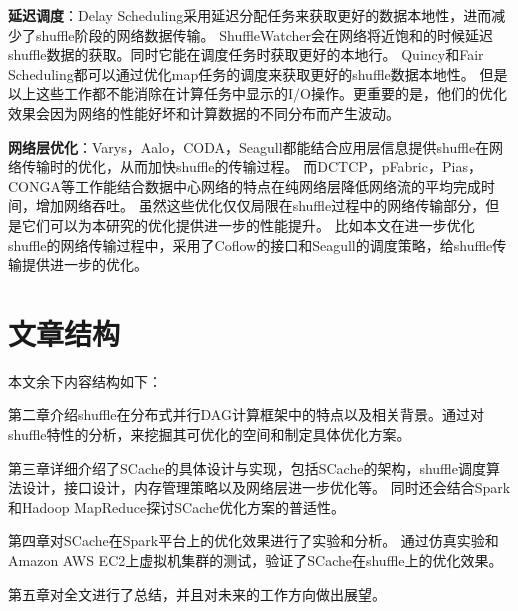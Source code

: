 \textbf{延迟调度}：Delay Scheduling\cite{delay}采用延迟分配任务来获取更好的数据本地性，进而减少了shuffle阶段的网络数据传输。
ShuffleWatcher\cite{shufflewatcher}会在网络将近饱和的时候延迟shuffle数据的获取。同时它能在调度任务时获取更好的本地行。
Quincy\cite{quincy}和Fair Scheduling\cite{preemptive}都可以通过优化map任务的调度来获取更好的shuffle数据本地性。
但是以上这些工作都不能消除在计算任务中显示的I/O操作。更重要的是，他们的优化效果会因为网络的性能好坏和计算数据的不同分布而产生波动。

\textbf{网络层优化}：Varys\cite{varys}，Aalo\cite{aalo}，CODA\cite{coda}，Seagull\cite{seagull}都能结合应用层信息提供shuffle在网络传输时的优化，从而加快shuffle的传输过程。
而DCTCP\cite{dctcp}，pFabric\cite{pfabric}，Pias\cite{pias}，CONGA\cite{conga}等工作能结合数据中心网络的特点在纯网络层降低网络流的平均完成时间，增加网络吞吐。
虽然这些优化仅仅局限在shuffle过程中的网络传输部分，但是它们可以为本研究的优化提供进一步的性能提升。
比如本文在进一步优化shuffle的网络传输过程中，采用了Coflow\cite{coflow}的接口和Seagull的调度策略，给shuffle传输提供进一步的优化。

\section{文章结构}

本文余下内容结构如下：

第二章介绍shuffle在分布式并行DAG计算框架中的特点以及相关背景。通过对shuffle特性的分析，来挖掘其可优化的空间和制定具体优化方案。

第三章详细介绍了SCache的具体设计与实现，包括SCache的架构，shuffle调度算法设计，接口设计，内存管理策略以及网络层进一步优化等。
同时还会结合Spark\cite{apachespark}和Hadoop MapReduce\cite{hadoop}探讨SCache优化方案的普适性。

第四章对SCache在Spark\cite{apachespark}平台上的优化效果进行了实验和分析。
通过仿真实验和Amazon AWS EC2上虚拟机集群的测试，验证了SCache在shuffle上的优化效果。

第五章对全文进行了总结，并且对未来的工作方向做出展望。







